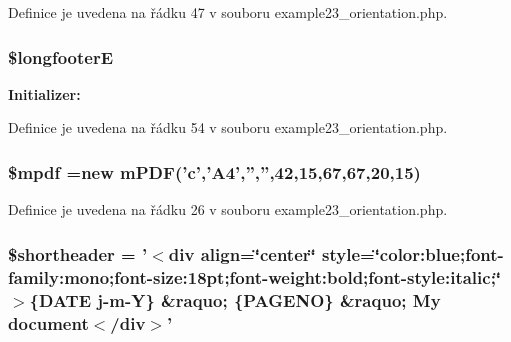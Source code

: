 Definice je uvedena na řádku 47 v souboru example23\-\_\-orientation.\-php.

\hypertarget{example23__orientation_8php_aea21e8ae6aced69a5ec0d2bb00ca880b}{
\subsubsection[{\$longfooter\-E}]{\setlength{\rightskip}{0pt plus 5cm}\$longfooter\-E}}\label{example23__orientation_8php_aea21e8ae6aced69a5ec0d2bb00ca880b}
{\bfseries Initializer\-:}


Definice je uvedena na řádku 54 v souboru example23\-\_\-orientation.\-php.

\hypertarget{example23__orientation_8php_ad028f81910d6cbab9b184d2214b3a8f8}{
\subsubsection[{\$mpdf}]{\setlength{\rightskip}{0pt plus 5cm}\$mpdf =new {\bf m\-P\-D\-F}('c','A4','','',42,15,67,67,20,15)}}\label{example23__orientation_8php_ad028f81910d6cbab9b184d2214b3a8f8}


Definice je uvedena na řádku 26 v souboru example23\-\_\-orientation.\-php.

\hypertarget{example23__orientation_8php_a2fe60c986ad33d96728266b0f9d89eb2}{
\subsubsection[{\$shortheader}]{\setlength{\rightskip}{0pt plus 5cm}\$shortheader = '$<$div align=\char`\"{}center\char`\"{} style=\char`\"{}color\-:blue;font-\/family\-:mono;font-\/size\-:18pt;font-\/weight\-:bold;font-\/style\-:italic;\char`\"{}$>$\{D\-A\-T\-E j-\/m-\/Y\} \&raquo; \{P\-A\-G\-E\-N\-O\} \&raquo; My document$<$/div$>$'}}\label{example23__orientation_8php_a2fe60c986ad33d96728266b0f9d89eb2}


